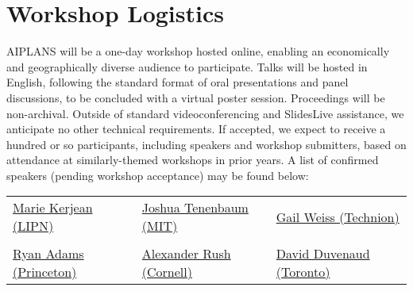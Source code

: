 \documentclass{article}
\begin{document}





    \section*{Workshop Logistics}

    AIPLANS will be a one-day workshop hosted online, enabling an economically and geographically diverse audience to participate. Talks will be hosted in English, following the standard format of oral presentations and panel discussions, to be concluded with a virtual poster session. Proceedings will be non-archival. Outside of standard videoconferencing and SlidesLive assistance, we anticipate no other technical requirements. If accepted, we expect to receive a hundred or so participants, including speakers and workshop submitters, based on attendance at similarly-themed workshops in prior years. A list of confirmed speakers (pending workshop acceptance) may be found below:

    \begin{center}
        \begin{tabular}{ l l l }
            \href{https://www.irif.fr/~kerjean/}{Marie Kerjean (LIPN)} & \href{https://mitibmwatsonailab.mit.edu/people/joshua-tenenbaum/}{Joshua Tenenbaum (MIT)} & \href{https://sgailw.cswp.cs.technion.ac.il/}{Gail Weiss (Technion)} \\\\
            \href{https://www.cs.princeton.edu/~rpa/}{Ryan Adams (Princeton)} & \href{http://rush-nlp.com/}{Alexander Rush (Cornell)} & \href{http://www.cs.toronto.edu/~duvenaud/}{David Duvenaud (Toronto)}
        \end{tabular}
    \end{center}
\end{document}
